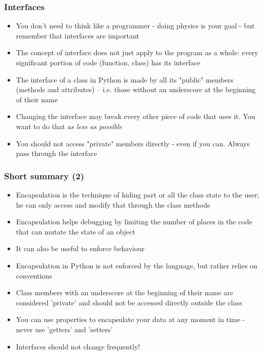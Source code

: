 \documentclass[9pt]{beamer}
\begin{document}
\begin{frame}
  \frametitle{Interfaces}

  \begin{itemize}
    \item You don't need to think like a programmer - doing physics is your goal - but
          remember that \alert{interfaces are important}
    \medskip
    \item The concept of interface does not just apply to the program as a whole:
          every significant portion of code (function, class) has its interface
    \medskip
    \item The interface of a class in Python is made by all its "public" members (methods and attributes)
          -- i.e. those without an underscore at the beginning of their name
    \medskip
    \item Changing the interface may break every other piece of code that uses it.
          You want to do that \emph{as less as possible}
    \medskip
    \item You should not access "private" members directly - even if you can. Always
          pass through the interface

  \end{itemize}

\end{frame}


\begin{frame}
  \frametitle{Short summary (2)}

  \begin{itemize}
    \small
    \item Encapsulation is the technique of hiding part or all the class state to the user;
          he can only access and modify that through the class methods
    \medskip
    \item Encapsulation helps debugging by limiting the number of places in the code
          that can mutate the state of an object
    \medskip
    \item It can also be useful to enforce behaviour
    \medskip
    \item Encapsulation in Python is not enforced by the language, but rather relies on conventions
    \medskip
    \item Class members with an underscore at the beginning of their name are
          considered 'private' and should not be accessed directly outside the class
    \smallskip
    \item You can use properties to encapsulate your data at any moment in time - never use 'getters' and 'setters'
    \medskip
    \item Interfaces should not change frequently!
  \end{itemize}

\end{frame}
\end{document}
